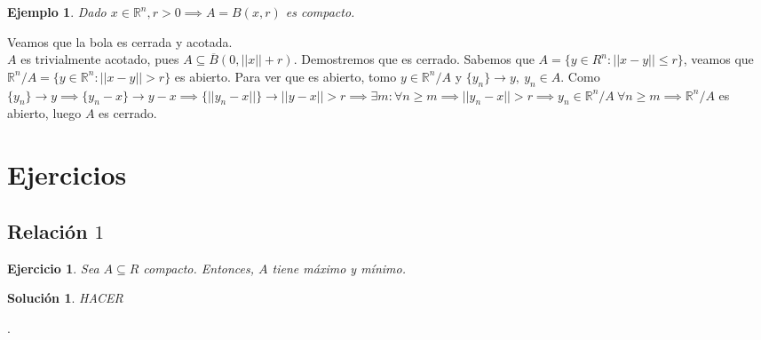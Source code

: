 \documentclass[11pt, a4paper]{article}
\makeatletter
\newif\IfInSansMode
\let\oldsf\sffamily
\renewcommand*{\sffamily}{\oldsf\mathversion{sans}\InSansModetrue}
\let\oldnorm\normalfont
\renewcommand*{\normalfont}{\oldnorm\InSansModefalse\mathversion{normal}}
\newcommand{\R}{\mathbb{R}} \newcommand{\N}{\mathbb{N}}
\renewenvironment{proof}[1][\proofname] {\par\pushQED{\qed}\normalfont\topsep6\p@\@plus6\p@\relax\trivlist\item[\hskip\labelsep\itshape\sffamily#1\@addpunct{.}]\ignorespaces}{\popQED\endtrivlist\@endpefalse}
\theoremstyle{theorem-style}
\theoremstyle{definition-style}
\newtheorem{ejer}{Ejercicio}[section]
\theoremstyle{remark-style}
\newtheorem*{sol}{Solución}
\theoremstyle{example-style}
\newtheorem{ejemplo}{Ejemplo}[section]
\makeatother
\begin{document}
\begin{ejemplo}
Dado $x \in \R^n, r > 0 \implies A = B(x,r)$ es compacto.
\end{ejemplo}

\begin{proof}
	Veamos que la bola es cerrada y acotada. \\
	$A$ es trivialmente acotado, pues $A \subseteq \overline{B}(0, ||x||+r).$ Demostremos que es cerrado. Sabemos que $A = \{y \in R^n: ||x-y|| \le r\}$, veamos que $ \R^n/A = \{y \in \R^n: ||x-y||>r\}$ es abierto. Para ver que es abierto, tomo $y \in \R^n/A$ y $ \{y_n\} \rightarrow y, \ y_n \in A$. Como $\{y_n\} \rightarrow y \implies \{y_n-x\} \rightarrow y - x \implies \{||y_n-x||\} \rightarrow ||y - x|| > r \implies \exists m: \forall n \ge m \implies ||y_n-x||>r \implies y_n \in \R^n/A \ \forall n \ge m \implies \R^n/A$ es abierto, luego $A$ es cerrado.
\end{proof}






\section{Ejercicios}

\subsection{Relación $1$}

\begin{ejer}
Sea $A \subseteq R$ compacto. Entonces, $A$ tiene máximo y mínimo.
\end{ejer}

\begin{sol}
	HACER
\end{sol}




\newpage

\begin{thebibliography}{9}

.

\end{thebibliography}



\end{document}
